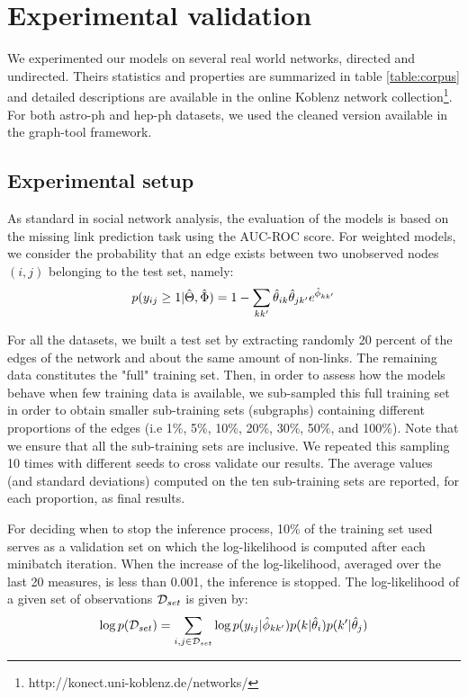 \section{Experimental validation}
\label{sec:exps}

We experimented our models on several real world networks, directed and undirected. Theirs statistics and properties are summarized in table \ref{table:corpus} and detailed descriptions are available in the online Koblenz network collection\footnote{http://konect.uni-koblenz.de/networks/}. For both astro-ph and hep-ph datasets, we used the cleaned version available in the  graph-tool framework.

\begin{table}[h]
\bgroup
\def\arraystretch{1} %
	
\egroup
\label{table:corpus}
\end{table}

\subsection{Experimental setup}
As standard in social network analysis, the evaluation of the models is based on the missing link prediction task using the AUC-ROC score. For weighted models, we consider the probability that an edge exists between two unobserved nodes $(i,j)$ belonging to the test set, namely:
\[
p(y_{ij} \geq 1 | \hat\Theta, \hat\Phi) = 1 - \sum_{kk'} \hat\theta_{ik} \hat\theta_{jk'} e^{\hat\phi_{kk'}}
\]

For all the datasets, we built a test set by extracting randomly 20 percent of the edges of the network and about the same amount of non-links. The remaining data constitutes the "full" training set. Then, in order to assess how the models behave when few training data is available, we sub-sampled this full training set in order to obtain smaller sub-training sets (subgraphs) containing different proportions of the edges (i.e 1\%, 5\%, 10\%, 20\%, 30\%, 50\%, and 100\%). Note that we ensure that all the sub-training sets are inclusive. We repeated this sampling 10 times with different seeds to cross validate our results. The average values (and standard deviations) computed on the ten sub-training sets are reported, for each proportion, as final results.

For deciding when to stop the inference process, 10\% of the training set used serves as a validation set on which the log-likelihood is computed after each minibatch iteration. When the increase of the log-likelihood, averaged over the last 20 measures, is less than 0.001, the inference is stopped. The log-likelihood of a given set of observations $\mathcal{D}_{set}$  is given by:
\begin{equation*}
\log p(\mathcal{D}_{set}) = \sum_{i,j \in \mathcal{D}_{set}} \log p(y_{ij} | \hat\phi_{kk'}) p(k|\hat\theta_i) p(k'|\hat\theta_j)
\end{equation*}

